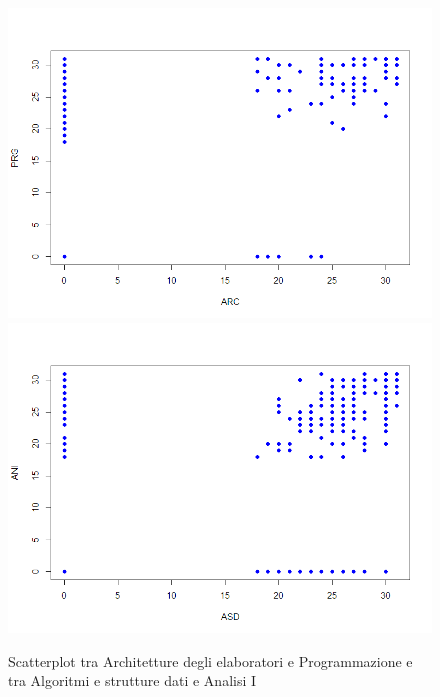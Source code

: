 \documentclass[12pt]{article}
\begin{document}
\begin{figure}[H]
	\centering
	\includegraphics[width=\textwidth]{img/arcPrg.png}
	\includegraphics[width=\textwidth]{img/asdAni.png}
	\captionsetup{justification=centering}
	\caption{Scatterplot tra Architetture degli elaboratori e Programmazione e tra Algoritmi e strutture dati e Analisi I}
\end{figure}
\end{document}
